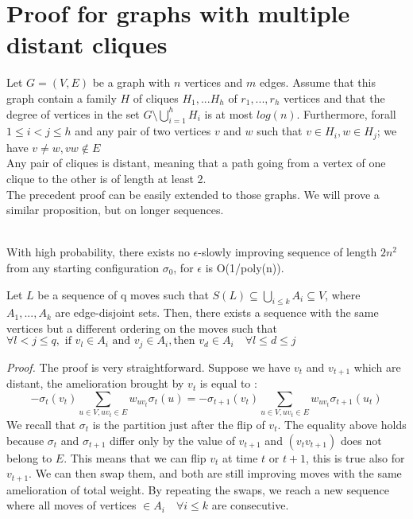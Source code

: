 \section{Proof for graphs with multiple distant cliques}
Let $G = (V,E)$ be a graph with $n$ vertices and $m$ edges. Assume that this graph contain a family $H$ of cliques $H_1, ... H_h$ of $r_1, ... , r_h$ vertices and that the degree of vertices in the set $G \setminus \bigcup_{i = 1}^h H_i$ is at most $log(n)$. Furthermore, forall $1 \leq i < j \leq h$ and any pair of two vertices $v$ and $w$ such that  $v \in H_i, w \in H_j$; we have $v \neq w, vw \not \in E$\\
Any pair of cliques is distant, meaning that a path going from a vertex of one clique to the other is of length at least 2. \\
The precedent proof can be easily extended to those graphs. We will prove a similar proposition, but on longer sequences.

\begin{proposition}
\leavevmode \\
With high probability, there exists no $\epsilon$-slowly improving sequence of length $2n^2$ from any starting configuration $\sigma_0$, for $\epsilon$ is O(1/poly(n)).
\end{proposition}

\begin{lemma}
\label{edgeDisjoint}
Let $L$ be a sequence of q moves such that $S(L) \subseteq \bigcup_{i \leq k}A_i  \subseteq V$, where $A_1, ... , A_k$ are edge-disjoint sets. Then, there exists a sequence with the same vertices but a different ordering on the moves such that $\forall l < j \leq q, \text{ if } v_l \in A_i \text{ and } v_j \in A_i, \text{then } v_d \in A_i \quad\forall l \leq d  \leq j$   
\end{lemma}
\textit{Proof.} The proof is very straightforward. Suppose we have $v_t$ and $v_{t+1}$ which are distant, the amelioration brought by $v_t$ is equal to :
\begin{equation*}
-\sigma_t(v_t) \sum_{u \in V, uv_t \in E}w_{uv_t}\sigma_t(u) = -\sigma_{t+1}(v_t) \sum_{u \in V, uv_t \in E}w_{uv_t}\sigma_{t+1}(u_t) 
\end{equation*}
We recall that $\sigma_t$ is the partition just after the flip of $v_t$. The equality above holds because $\sigma_t$ and $\sigma_{t+1}$ differ only by the value of $v_{t+1}$ and $ (v_t v_{t+1})$ does not belong to $E$. This means that we can flip $v_t$ at time $t$ or $t+1$, this is true also for $v_{t+1}$. We can then swap them, and both are still improving moves with the same amelioration of total weight. By repeating the swaps, we reach a new sequence where all moves of vertices $\in A_i \quad \forall i \leq k$ are consecutive.\\

